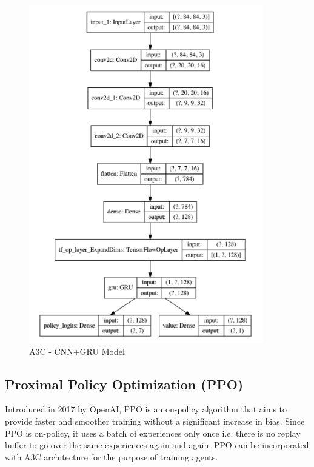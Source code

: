 \documentclass[conference]{IEEEtran}
\begin{document}
\begin{figure}[htp]
    \centering
    \includegraphics[width=\linewidth]{a3c_gru.png}
    \caption{A3C - CNN+GRU Model}
    \label{a3c_cnn_gru}
\end{figure}

\subsection{\textbf{Proximal Policy Optimization (PPO)}}

Introduced in 2017 by OpenAI, PPO \cite{Open-ai-gym} is an on-policy algorithm that aims to provide faster and smoother training without a significant increase in bias. Since PPO is on-policy, it uses a batch of experiences only once i.e. there is no replay buffer to go over the same experiences again and again. PPO can be incorporated with A3C architecture for the purpose of training agents. 
\end{document}
